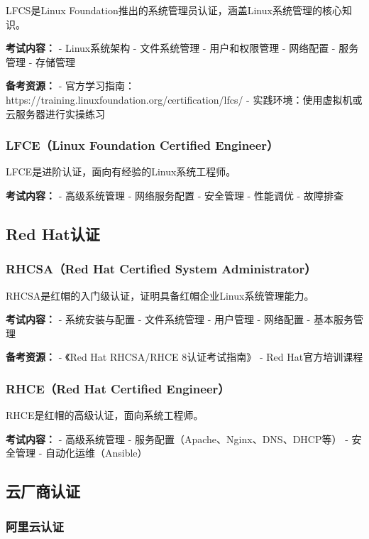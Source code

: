 \documentclass[12pt,UTF8]{ctexbook}
\begin{document}
LFCS是Linux Foundation推出的系统管理员认证，涵盖Linux系统管理的核心知识。

\textbf{考试内容：}
- Linux系统架构
- 文件系统管理
- 用户和权限管理
- 网络配置
- 服务管理
- 存储管理

\textbf{备考资源：}
- 官方学习指南：https://training.linuxfoundation.org/certification/lfcs/
- 实践环境：使用虚拟机或云服务器进行实操练习

\subsubsection*{LFCE（Linux Foundation Certified Engineer）}

LFCE是进阶认证，面向有经验的Linux系统工程师。

\textbf{考试内容：}
- 高级系统管理
- 网络服务配置
- 安全管理
- 性能调优
- 故障排查

\subsection*{Red Hat认证}

\subsubsection*{RHCSA（Red Hat Certified System Administrator）}

RHCSA是红帽的入门级认证，证明具备红帽企业Linux系统管理能力。

\textbf{考试内容：}
- 系统安装与配置
- 文件系统管理
- 用户管理
- 网络配置
- 基本服务管理

\textbf{备考资源：}
- 《Red Hat RHCSA/RHCE 8认证考试指南》
- Red Hat官方培训课程

\subsubsection*{RHCE（Red Hat Certified Engineer）}

RHCE是红帽的高级认证，面向系统工程师。

\textbf{考试内容：}
- 高级系统管理
- 服务配置（Apache、Nginx、DNS、DHCP等）
- 安全管理
- 自动化运维（Ansible）

\subsection*{云厂商认证}

\subsubsection*{阿里云认证}
\end{document}
